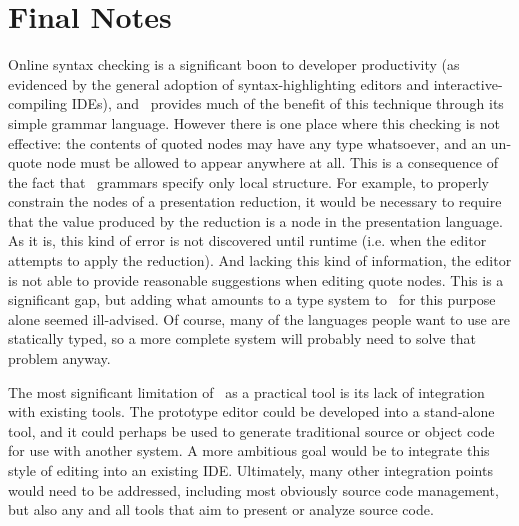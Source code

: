 \section{Final Notes}
Online syntax checking is a significant boon to developer productivity (as evidenced by the general adoption of syntax-highlighting editors and interactive-compiling IDEs), and \Meta\ provides much of the benefit of this technique through its simple grammar language. However there is one place where this checking is not effective: the contents of quoted nodes may have any type whatsoever, and an un-quote node must be allowed to appear anywhere at all. This is a consequence of the fact that \Meta\ grammars specify only local structure. For example, to properly constrain the nodes of a presentation reduction, it would be necessary to require that the value produced by the reduction is a node in the presentation language. As it is, this kind of error is not discovered until runtime (i.e. when the editor attempts to apply the reduction). And lacking this kind of information, the editor is not able to provide reasonable suggestions when editing quote nodes. This is a significant gap, but adding what amounts to a type system to \Meta\ for this purpose alone seemed ill-advised. Of course, many of the languages people want to use are statically typed, so a more complete system will probably need to solve that problem anyway.

The most significant limitation of \Meta\ as a practical tool is its lack of integration with existing tools. The prototype editor could be developed into a stand-alone tool, and it could perhaps be used to generate traditional source or object code for use with another system. A more ambitious goal would be to integrate this style of editing into an existing IDE. Ultimately, many other integration points would need to be addressed, including most obviously source code management, but also any and all tools that aim to present or analyze source code.